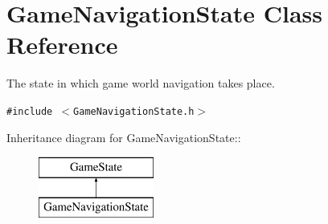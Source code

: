 \hypertarget{class_game_navigation_state}{
\section{GameNavigationState Class Reference}
\label{de/d2a/class_game_navigation_state}
}
The state in which game world navigation takes place.  


{\tt \#include $<$GameNavigationState.h$>$}

Inheritance diagram for GameNavigationState::\begin{figure}[H]
\begin{center}
\leavevmode
\includegraphics[height=2cm]{de/d2a/class_game_navigation_state}
\end{center}
\end{figure}
